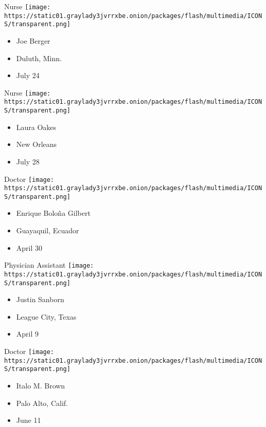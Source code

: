 Nurse
\texttt{[image: https://static01.graylady3jvrrxbe.onion/packages/flash/multimedia/ICONS/transparent.png]}

\begin{itemize}
\tightlist
\item
  Joe Berger
\item
  Duluth, Minn.
\item
  July 24
\end{itemize}

\protect\hyperlink{item-laura-oakes}{}

Nurse
\texttt{[image: https://static01.graylady3jvrrxbe.onion/packages/flash/multimedia/ICONS/transparent.png]}

\begin{itemize}
\tightlist
\item
  Laura Oakes
\item
  New Orleans
\item
  July 28
\end{itemize}

\protect\hyperlink{item-enrique-bolona-gilbert}{}

Doctor
\texttt{[image: https://static01.graylady3jvrrxbe.onion/packages/flash/multimedia/ICONS/transparent.png]}

\begin{itemize}
\tightlist
\item
  Enrique Boloña Gilbert
\item
  Guayaquil, Ecuador
\item
  April 30
\end{itemize}

\protect\hyperlink{item-justin-sanborn}{}

Physician Assistant
\texttt{[image: https://static01.graylady3jvrrxbe.onion/packages/flash/multimedia/ICONS/transparent.png]}

\begin{itemize}
\tightlist
\item
  Justin Sanborn
\item
  League City, Texas
\item
  April 9
\end{itemize}

\protect\hyperlink{item-italo-m-brown}{}

Doctor
\texttt{[image: https://static01.graylady3jvrrxbe.onion/packages/flash/multimedia/ICONS/transparent.png]}

\begin{itemize}
\tightlist
\item
  Italo M. Brown
\item
  Palo Alto, Calif.
\item
  June 11
\end{itemize}


